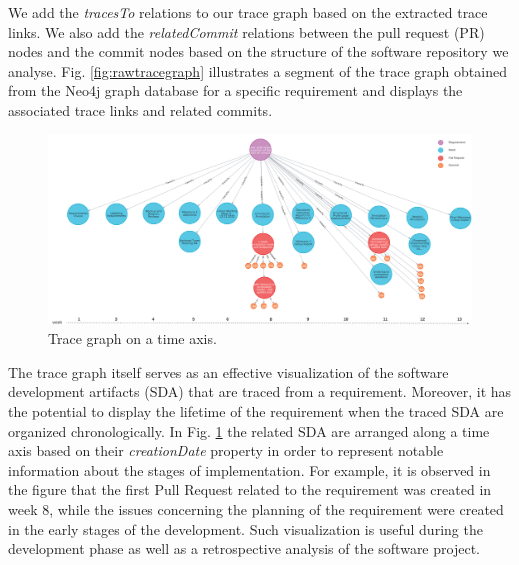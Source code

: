   We add the \emph{tracesTo} relations to our trace graph based on the extracted trace links. We also add the \emph{relatedCommit} relations between the pull request (PR) nodes and the commit nodes based on the structure of the software repository we analyse. Fig. \ref{fig:rawtracegraph} illustrates a segment of the trace graph obtained from the Neo4j graph database for a specific requirement and displays the associated trace links and related commits.

\begin{figure}[htb]
    \centering
    \includegraphics[width=.99\linewidth]{figs/traceGraph.png}
    \caption{Trace graph on a time axis.}
    \label{fig:tracegraph}
\end{figure}

The trace graph itself serves as an effective visualization of the software development artifacts (SDA) that are traced from a requirement. Moreover, it has the potential to display the lifetime of the requirement when the traced SDA are organized chronologically. In Fig. \ref{fig:tracegraph} the related SDA are arranged along a time axis based on their \textit{creationDate} property in order to represent notable information about the stages of implementation. For example, it is observed in the figure that the first Pull Request related to the requirement was created in week 8, while the issues concerning the planning of the requirement were created in the early stages of the development. Such visualization is useful during the development phase as well as a retrospective analysis of the software project.







